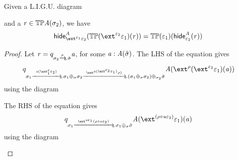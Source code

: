 \begin{lemma}\label{lem:thidemon-hide-ext-com}
    Given a L.I.G.U. diagram
     and a $\mathit{r} \in {\mathbb{T}{\mathbb{P}}}\mathit{A}(\sigma_2)$, we have
    \[ \hideRes\vA{\ext^{\me_1}\me_2}(\thideMon(\ext^{\me_2}\me_1)(\vr)) = \thideMon(\me_1)(\hideRes\vA{\me_2}(\vr)) \] 
\end{lemma}
\begin{proof}
    Let $\vr = \eqclass{\sigma_2 \xato\rho \hat\sigma} \va$, for some $\mathit{a} : \mathit{A}(\hat\sigma)$.
    The LHS of the equation gives
    \[ 
        \eqclass{\sigma_1 \xato{\tinstU(\ext^\me_1\me_2)} \sigma_1 \liplus\sigma \sigma_2 
                          \xato{\ext^{\tinstU(\ext^{\me_2}\me_1)}\rho)} (\sigma_1 \liplus\sigma \sigma_2) \liplus{\sigma_2} \hat\sigma} 
                            \vA(\ext^\rho(\ext^{\me_2}\me_1)(\va))
    \]
    using the diagram
    \begin{center}
    \end{center}

    The RHS of the equation gives
    \[ 
        \eqclass{\sigma_1 \xato{\ext^{\tinstU\me_1}(\rho \comp \tinstU\me_2)} \sigma_1 \liplus\sigma \hat\sigma} \vA(\ext^{(\rho \comp \tinstU\me_2)}\me_1)(\va)
    \]
    using the diagram
    \begin{center}
    \end{center}


\end{proof}
